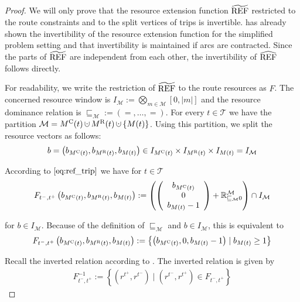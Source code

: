 \begin{proof}

We will only prove that the resource extension function $\widetilde{\operatorname{REF}}$ restricted to the route constraints and to the split vertices of trips is invertible. \cite{Kaiser} has already shown the invertibility of the resource extension function for the simplified problem setting and that invertibility is maintained if arcs are contracted. Since the parts of $\widetilde{\operatorname{REF}}$ are independent from each other, the 	invertibility of $\widehat{\operatorname{REF}}$ follows directly.

For readability, we write the restriction of $\widetilde{\operatorname{REF}}$ to the route resources as $F$. The concerned resource window is ${I_\mathcal{M} := \bigotimes_{m\in\mathcal{M}}[0,\vert m\vert]}$ and the resource dominance relation is ${\sqsubseteq_{\mathcal{M}} := \left(=,\dots,=\right)}$. For every $t\in\mathcal{T}$ we have the partition ${\mathcal{M} = \MC(t)\cupdot\MRoute(t)\cupdot\left\{M(t)\right\}}$. Using this partition, we split the resource vectors as follows:
\begin{align*}
	b = \left(b_{M^{\operatorname{C}}(t)},b_{M^{\operatorname{R}}(t)},b_{M(t)}\right)\in I_{M^{\operatorname{C}}(t)}\times I_{M^{\operatorname{R}}(t)}\times I_{M(t)} = I_{\mathcal{M}}
\end{align*}

According to $\eqref{eq:ref_trip}$ we have for $t\in\mathcal{T}$
\begin{align*}
	F_{t^-,t^+}\left(b_{M^{\operatorname{C}}(t)},b_{M^{\operatorname{R}}(t)},b_{M(t)}\right) := \left(\left( \begin{array}{c}
		b_{M^{\operatorname{C}}(t)} \\ 0 \\ b_{M(t)} - 1
	\end{array} \right) + \mathbb{R}_{\sqsubseteq_{\mathcal{M}} 0}^{\mathcal{M}} \right) \cap I_\mathcal{M}
\end{align*}

for $b\in I_{\mathcal{M}}$. Because of the definition of $\sqsubseteq_{\mathcal{M}}$ and ${b\in I_{\mathcal{M}}}$, this is equivalent to
\begin{align*}
	F_{t^-,t^+}\left(b_{M^{\operatorname{C}}(t)},b_{M^{\operatorname{R}}(t)},b_{M(t)}\right) := \left\{\left( b_{M^{\operatorname{C}}(t)}, 0, b_{M(t)} - 1\right)\mid b_{M(t)}\geq 1\right\}
\end{align*}

Recall the inverted relation according to . The inverted relation is given by
\begin{align*}
	F^{-1}_{t^-,t^+} := \left\{\left(r^{t^+},r^{t^-}\right)\mid \left(r^{t^-},r^{t^+}\right)\in F_{t^-,t^+}\right\}
\end{align*}


\end{proof}

